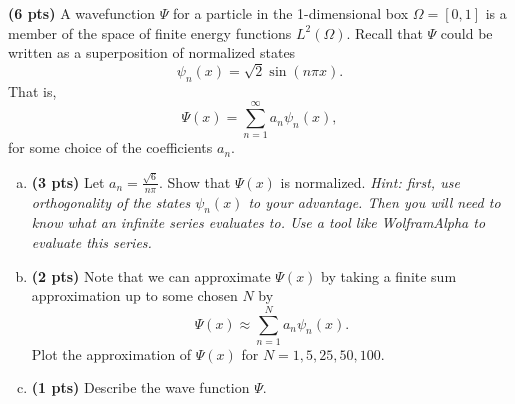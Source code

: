 \documentclass[12pt]{article} %
\begin{document}
\newpage
\begin{problem}
\textbf{(6 pts)} A wavefunction $\Psi$ for a particle in the 1-dimensional box $\Omega=[0,1]$ is a member of the space of finite energy functions $L^2(\Omega)$. Recall that $\Psi$ could be written as a superposition of normalized states
	\[
	\psi_n(x) = \sqrt{2} \sin\left(n\pi x\right).
	\]
	That is,
	\[
	\Psi(x) = \sum_{n=1}^\infty a_n \psi_n(x),
	\]
	for some choice of the coefficients $a_n$.
	\begin{enumerate}[(a)]
		\item \textbf{(3 pts)} Let $a_n = \frac{\sqrt{6}}{n\pi}$. Show that $\Psi(x)$ is normalized. \emph{Hint: first, use orthogonality of the states $\psi_n(x)$ to your advantage. Then you will need to know what an infinite series evaluates to. Use a tool like WolframAlpha to evaluate this series.}
		\item \textbf{(2 pts)} Note that we can approximate $\Psi(x)$ by taking a finite sum approximation up to some chosen $N$ by
		\[
			\Psi(x) \approx \sum_{n=1}^N a_n \psi_n(x).
		\]
		Plot the approximation of $\Psi(x)$ for $N=1,5,25,50,100$.  
\item \textbf{(1 pts)} Describe the wave function $\Psi$.
		\end{enumerate}
\end{problem}
\end{document}
